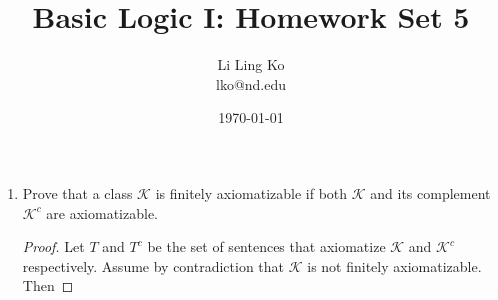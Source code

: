 \documentclass{article}
\begin{document}
\title{Basic Logic I: Homework Set 5}
\author{Li Ling Ko\\ lko@nd.edu}
\date{\today}
\maketitle

\begin{enumerate}
  \item Prove that a class $\mathcal{K}$ is finitely axiomatizable if both
    $\mathcal{K}$ and its complement $\mathcal{K}^c$ are axiomatizable.
    \begin{proof}
      Let $T$ and $T^c$ be the set of sentences that axiomatize
      $\mathcal{K}$ and $\mathcal{K}^c$ respectively. Assume by
      contradiction that $\mathcal{K}$ is not finitely axiomatizable. Then
    \end{proof}
\end{enumerate}
\end{document}
